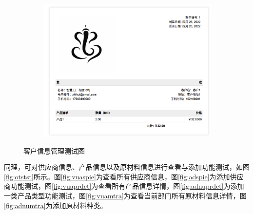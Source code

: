 \begin{figure}[H]
\begin{subfigure}{.35\textwidth}
        \label{fig:vuaods}
    \end{subfigure}
    \qquad
    \begin{subfigure}{.35\textwidth}
        \centering
        \includegraphics[width=\textwidth]{figures/6orderdetails.png}
        \label{fig:vuoddtls}
    \end{subfigure}
    \caption{客户信息管理测试图}
    \label{fig:cstmtst}
\end{figure}

同理，可对供应商信息、产品信息以及原材料信息进行查看与添加功能测试，如图\ref{fig:otstst}所示。图\ref{fig:vuaspie}为查看所有供应商信息，图\ref{fig:adspie}为添加供应商功能测试，图\ref{fig:vuaprdct}为查看所有产品信息详情，图\ref{fig:adnuprdct}为添加一类产品类型功能测试，图\ref{fig:vuamtra}为查看当前部门所有原材料信息详情，图\ref{fig:adnumtra}为添加原材料种类。

